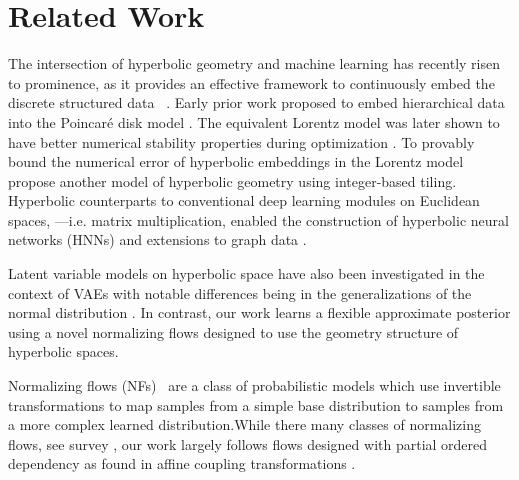 \section{Related Work}
The intersection of hyperbolic geometry and machine learning has recently risen to prominence, \cite{dhingra2018embedding,tay2018hyperbolic,law2019lorentzian,khrulkov2019hyperbolic} as it provides an effective framework to continuously embed the discrete structured data ~\cite{krioukov2010hyperbolic}. Early prior work proposed to embed hierarchical data into the Poincar\'e disk model \cite{nickel2017poincare,chamberlain2017neural}.
The equivalent Lorentz model was later shown to have better numerical stability properties during optimization \cite{nickel2018learning}. 
To provably bound the numerical error of hyperbolic embeddings in the Lorentz model \cite{yu2019numerically} propose another model of hyperbolic geometry using integer-based tiling. 
Hyperbolic counterparts to conventional deep learning modules on Euclidean spaces, ---i.e. matrix multiplication, enabled the construction of hyperbolic neural networks (HNNs) \cite{gulcehre2018hyperbolic,ganea2018hyperbolic} and extensions to graph data \cite{liu2019graph,chami2019hyperbolic}.

Latent variable models on hyperbolic space have also been investigated in the context of VAEs with notable differences being in the generalizations of the normal distribution \cite{nagano2019wrapped,mathieu2019continuous}. In contrast, our work learns a flexible approximate posterior using a novel normalizing flows designed to use the geometry structure of hyperbolic spaces.

Normalizing flows (NFs)~\cite{rezende2015variational,dinh2016density} are a class of probabilistic models which use invertible transformations to map samples from a simple base distribution to samples from a more complex learned distribution.While there many classes of normalizing flows, see survey \cite{papamakarios2019normalizing,kobyzev2019normalizing}, our work largely follows flows designed with partial ordered dependency as found in affine coupling transformations \cite{dinh2016density}. 

